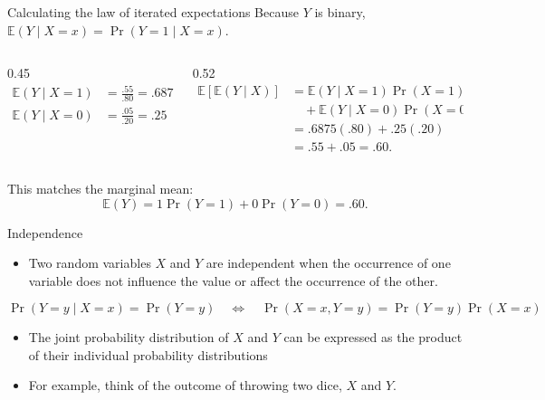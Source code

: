 \documentclass[notes,10pt, aspectratio=169]{beamer}
\begin{document}
\begin{frame}{Calculating the law of iterated expectations}
\small
Because $Y$ is binary, $\mathbb{E}(Y\mid X=x)=\Pr(Y=1\mid X=x)$.
\vspace{.2cm}
\begin{columns}[T]
\begin{column}{0.45\textwidth}
\begin{align*}
\mathbb{E}(Y\mid X=1)&=\frac{.55}{.80}=.6875\\
\mathbb{E}(Y\mid X=0)&=\frac{.05}{.20}=.25
\end{align*}
\end{column}
\begin{column}{0.52\textwidth}
\begin{align*}
\mathbb{E}[\mathbb{E}(Y\mid X)]
&=\mathbb{E}(Y\mid X=1)\Pr(X=1)\\
&\quad+\mathbb{E}(Y\mid X=0)\Pr(X=0)\\
&=.6875(.80)+.25(.20)\\
&=.55+.05=.60.
\end{align*}
\end{column}
\end{columns}
\vspace{.2cm}
This matches the marginal mean:
\[
\mathbb{E}(Y)=1\Pr(Y=1)+0\Pr(Y=0)=.60.
\]
\end{frame}


\begin{frame}{Independence}
    \begin{itemize}
        \item Two random variables $X$ and $Y$ are independent when the occurrence of one variable does not influence the value or affect the occurrence of the other.\vspace{.3cm}
    \end{itemize}
    \begin{equation*}
        \Pr(Y=y\mid X=x)=\Pr(Y=y)
        \quad\Longleftrightarrow\quad
        \Pr(X=x,Y=y)=\Pr(Y=y)\Pr(X=x)
    \end{equation*}
    \begin{itemize}
        \item  The joint probability distribution of $X$ and $Y$ can be expressed as the product of their individual probability distributions\vspace{.3cm}
        \item For example, think of the outcome of throwing two dice, $X$ and $Y$. 
    \end{itemize}
\end{frame}
\end{document}
